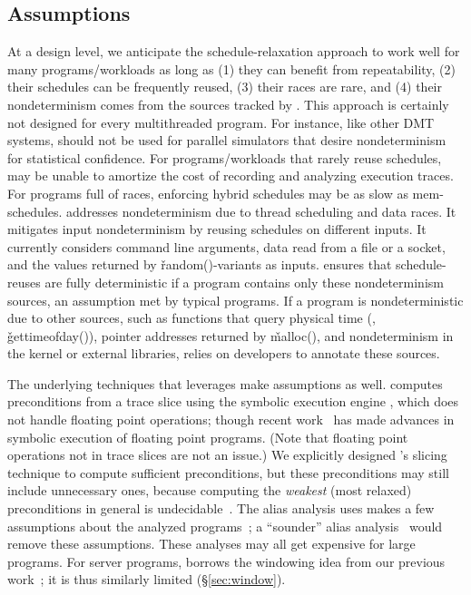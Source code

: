 \subsection{Assumptions} \label{sec:limitations}

At a design level, we anticipate the schedule-relaxation approach to work
well for many programs/workloads as long as (1) they can benefit from
repeatability, (2) their schedules can be frequently reused, (3) their
races are rare, and (4) their nondeterminism comes from the sources
tracked by \peregrine.  This approach is certainly not designed for every
multithreaded program. For instance, like other DMT systems, \peregrine should
not be used for parallel simulators that desire nondeterminism for
statistical confidence.  For programs/workloads that rarely reuse
schedules, \peregrine may be unable to amortize the cost of recording and
analyzing execution traces.  For programs full of races, enforcing hybrid
schedules may be as slow as mem-schedules.  \peregrine addresses nondeterminism
due to thread scheduling and data races.  It mitigates input
nondeterminism by reusing schedules on different inputs.  It currently
considers command line arguments, data read from a file or a socket, and
the values returned by \v{random()}-variants as inputs.  \peregrine ensures that
schedule-reuses are fully deterministic if a program contains only these
nondeterminism sources, an assumption met by typical programs.  If a
program is nondeterministic due to other sources, such as functions that
query physical time (\eg, \v{gettimeofday()}), pointer addresses returned
by \v{malloc()}, and nondeterminism in the kernel or external libraries,
\peregrine relies on developers to annotate these sources.


The underlying techniques that \peregrine leverages make assumptions as well.
\peregrine computes preconditions from a trace slice using the symbolic
execution engine \klee, which does not handle floating point operations;
though recent work~\cite{klee-fp} has made advances in symbolic execution
of floating point programs.  (Note
that floating point operations not in trace slices are not an issue.)  We
explicitly designed \peregrine's slicing technique to compute sufficient
preconditions, but these preconditions may still include unnecessary ones,
because computing the \emph{weakest} (most relaxed) preconditions in general is
undecidable~\cite{aho:dragon:06}.  The alias analysis \peregrine uses makes a
few assumptions about the analyzed programs~\cite{alias:icse05};
a ``sounder'' alias analysis~\cite{alias:fse06} would remove these
assumptions.  These analyses may all get expensive for large
programs.  For server programs, \peregrine borrows the
windowing idea from our previous work~\cite{cui:tern:osdi10}; it is thus
similarly limited (\S\ref{sec:window}).

